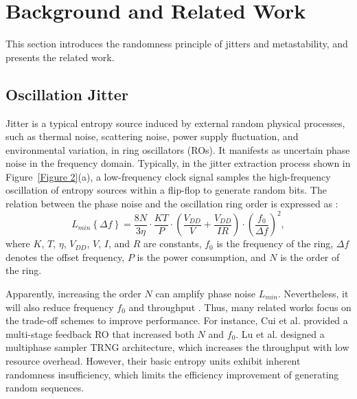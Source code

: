 \section{Background and Related Work}
\label{Section: Background and related work}

This section introduces the randomness principle of jitters and metastability, and presents the related work.

\subsection{ Oscillation Jitter }
\label{Section: Oscillation Jitter}
Jitter is a typical entropy source induced by external random physical processes, such as thermal noise, scattering noise, power supply fluctuation, and environmental variation, in ring oscillators (ROs).
It manifests as uncertain phase noise in the frequency domain. Typically, in the jitter extraction process shown in Figure~\ref{Figure 2}(a), a low-frequency clock signal samples the high-frequency oscillation of entropy sources within a flip-flop to generate random bits. The relation between the phase noise and the oscillation ring order is expressed as \cite{Jitter}:
\begin{equation}
L_{min}\left \{ \Delta f \right \} =\frac{8N}{3\eta }\cdot \frac{KT}{P}\cdot \left ( \frac{V_{DD} }{V} +\frac{V_{DD} }{IR}  \right )\cdot \left ( \frac{f_{0}}{\Delta f}  \right )  ^{2},
\end{equation}
where $K$, $T$, $\eta $, $V_{DD}$, $V$, $I$, and $R$ are constants, $f_{0}$ is the frequency of the ring, $\Delta f$ denotes the offset frequency, $P$ is the power consumption, and $N$ is the order of the ring. 

Apparently, increasing the order $N$ can amplify phase noise $L_{min}$. Nevertheless, it will also reduce frequency $f_{0}$ and throughput \cite{Cui}. Thus, many related works focus on the trade-off schemes to improve performance. For instance, Cui et al. \cite{Cui} provided a multi-stage feedback RO that increased both $N$ and $f_{0}$. Lu et al. \cite{DAC2023} designed a multiphase sampler TRNG architecture, which increases the throughput with low resource overhead. However, their basic entropy units exhibit inherent randomness insufficiency, which limits the efficiency improvement of generating random sequences. 



